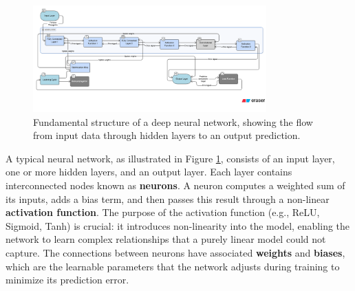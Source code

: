 \documentclass{report}
\begin{document}
\begin{figure}[H]
    \centering
    \includegraphics[width=0.8\textwidth]{images/deep-learning-graph.png}
    \caption{Fundamental structure of a deep neural network, showing the flow from input data through hidden layers to an output prediction.}
    \label{fig:deep-learning-graph}
\end{figure}

A typical neural network, as illustrated in Figure \ref{fig:deep-learning-graph}, consists of an input layer, one or more hidden layers, and an output layer. Each layer contains interconnected nodes known as \textbf{neurons}. A neuron computes a weighted sum of its inputs, adds a bias term, and then passes this result through a non-linear \textbf{activation function}. The purpose of the activation function (e.g., ReLU, Sigmoid, Tanh) is crucial: it introduces non-linearity into the model, enabling the network to learn complex relationships that a purely linear model could not capture. The connections between neurons have associated \textbf{weights} and \textbf{biases}, which are the learnable parameters that the network adjusts during training to minimize its prediction error.
\end{document}
